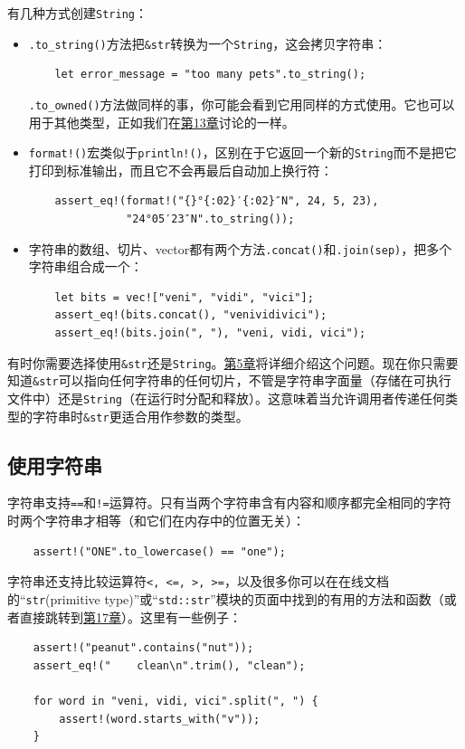 有几种方式创建\texttt{String}：
\begin{itemize}
    \item \texttt{.to\_string()}方法把\texttt{\&str}转换为一个\texttt{String}，这会拷贝字符串：
    \begin{verbatim}
    let error_message = "too many pets".to_string();
    \end{verbatim}
    \texttt{.to\_owned()}方法做同样的事，你可能会看到它用同样的方式使用。它也可以用于其他类型，正如我们在\hyperref[ch13]{第13章}讨论的一样。

    \item \texttt{format!()}宏类似于\texttt{println!()}，区别在于它返回一个新的\texttt{String}而不是把它打印到标准输出，而且它不会再最后自动加上换行符：
    \begin{verbatim}
    assert_eq!(format!("{}°{:02}′{:02}″N", 24, 5, 23),
               "24°05′23″N".to_string());
    \end{verbatim}

    \item 字符串的数组、切片、vector都有两个方法\texttt{.concat()}和\texttt{.join(sep)}，把多个字符串组合成一个：
    \begin{verbatim}
    let bits = vec!["veni", "vidi", "vici"];
    assert_eq!(bits.concat(), "venividivici");
    assert_eq!(bits.join(", "), "veni, vidi, vici");
    \end{verbatim}
\end{itemize}

有时你需要选择使用\texttt{\&str}还是\texttt{String}。\hyperref[ch05]{第5章}将详细介绍这个问题。现在你只需要知道\texttt{\&str}可以指向任何字符串的任何切片，不管是字符串字面量（存储在可执行文件中）还是\texttt{String}（在运行时分配和释放）。这意味着当允许调用者传递任何类型的字符串时\texttt{\&str}更适合用作参数的类型。

\subsection{使用字符串}

字符串支持\texttt{==}和\texttt{!=}运算符。只有当两个字符串含有内容和顺序都完全相同的字符时两个字符串才相等（和它们在内存中的位置无关）：
\begin{verbatim}
    assert!("ONE".to_lowercase() == "one");
\end{verbatim}

字符串还支持比较运算符\texttt{<, <=, >, >=}，以及很多你可以在在线文档的“\texttt{str}(primitive type)”或“\texttt{std::str}”模块的页面中找到的有用的方法和函数（或者直接跳转到\hyperref[ch17]{第17章}）。这里有一些例子：
\begin{verbatim}
    assert!("peanut".contains("nut"));
    assert_eq!("    clean\n".trim(), "clean");

    for word in "veni, vidi, vici".split(", ") {
        assert!(word.starts_with("v"));
    }
\end{verbatim}


